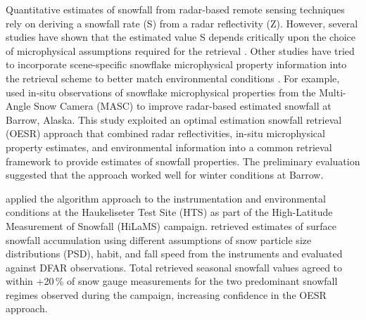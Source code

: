 \documentclass{ametsocV5}
\providecommand{\DIFadd}[1]{{\protect\color{blue}\uwave{#1}}} %
\providecommand{\DIFaddbegin}{} %
\providecommand{\DIFaddend}{} %
\newcommand{\DIFaddincludegraphics}[2][]{{\color{blue}\fbox{\DIFOincludegraphics[#1]{#2}}}} %
\DeclareRobustCommand{\DIFaddbegin}{\DIFOaddbegin \let\includegraphics\DIFaddincludegraphics} %
\DeclareRobustCommand{\DIFaddend}{\DIFOaddend \let\includegraphics\DIFOincludegraphics} %
\begin{document}
    Quantitative estimates of snowfall from radar-based remote sensing techniques rely on deriving a snowfall rate (S) from a radar reflectivity (Z). However, several studies have shown that the estimated value S depends critically upon the choice of microphysical assumptions required for the retrieval \citep{kulie_utilizing_2009,friedrich_quantifying_2020}. Other studies have tried to incorporate scene-specific snowflake microphysical property information into the retrieval scheme to better match environmental conditions \citep{wood_microphysical_2015}. For example, \citet{cooper_variational_2017} used in-situ observations of snowflake microphysical properties from the Multi-Angle Snow Camera (MASC) to improve radar-based estimated snowfall at Barrow, Alaska. This study exploited an optimal estimation snowfall retrieval (OESR) approach that combined radar reflectivities, in-situ microphysical property estimates, and environmental information into a common retrieval framework to provide estimates of snowfall properties. The preliminary evaluation suggested that the approach worked well for winter conditions at Barrow.

    \citet{schirle_estimation_2019} applied the \citet{cooper_variational_2017} algorithm approach to the instrumentation and environmental conditions at the Haukeliseter Test Site (HTS) as part of the High-Latitude Measurement of Snowfall (HiLaMS) campaign. \citet{schirle_estimation_2019} retrieved estimates of surface
	snowfall accumulation using different assumptions of snow particle size distributions (PSD), habit, and fall speed from the instruments and evaluated \DIFaddbegin \DIFadd{them }\DIFaddend against DFAR observations. Total retrieved seasonal snowfall values agreed to within +20\,\% of snow gauge measurements for the two predominant snowfall regimes observed during the campaign, increasing confidence in the OESR approach. 
\end{document}
